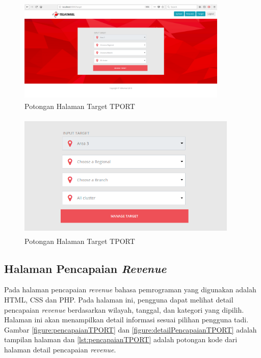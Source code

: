 

\begin{figure}[h!]
	\centerline
	{\includegraphics[width=10cm,height=5cm]{bab5/tampilanTarget.png}}
	\caption{Potongan Halaman Target TPORT}
	\label{figure:targetTPORT}
\end{figure}

\begin{figure}[h!]
	\centerline
	{\includegraphics[width=10.5cm,height=6cm]{bab5/detailTampilanTarget.png}}
	\caption{Potongan Halaman Target TPORT}
	\label{figure:detailTargetTPORT}
\end{figure}

\subsection{Halaman Pencapaian \textit{Revenue}}
Pada halaman pencapaian \textit{revenue} bahasa pemrograman yang digunakan adalah HTML, CSS dan PHP. Pada halaman ini, pengguna dapat melihat detail pencapaian \textit{revenue} berdasarkan wilayah, tanggal, dan kategori yang dipilih. Halaman ini akan menampilkan detail informasi sesuai pilihan pengguna tadi. Gambar \ref{figure:pencapaianTPORT} dan \ref{figure:detailPencapaianTPORT} adalah tampilan halaman dan \ref{lst:pencapaianTPORT} adalah potongan kode dari halaman detail pencapaian \textit{revenue}.

